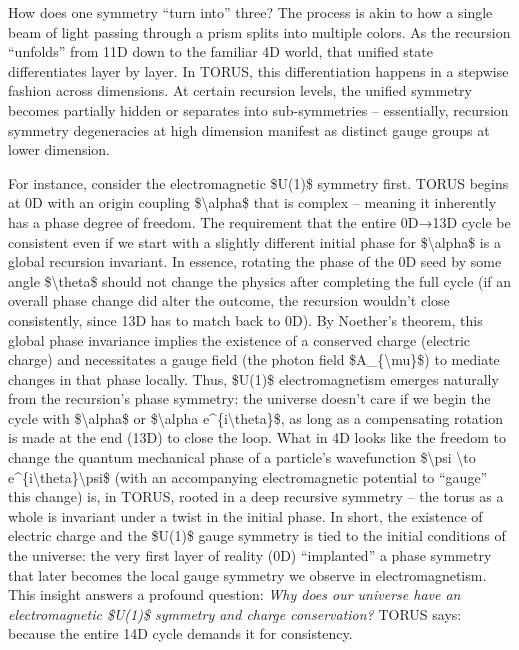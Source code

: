 \documentclass[
]{article}
\begin{document}
How does one symmetry ``turn into'' three? The process is akin to how a
single beam of light passing through a prism splits into multiple
colors. As the recursion ``unfolds'' from 11D down to the familiar 4D
world, that unified state differentiates layer by layer. In TORUS, this
differentiation happens in a stepwise fashion across dimensions. At
certain recursion levels, the unified symmetry becomes partially hidden
or separates into sub-symmetries -- essentially, recursion symmetry
degeneracies at high dimension manifest as distinct gauge groups at
lower dimension.

For instance, consider the electromagnetic \$U(1)\$ symmetry first.
TORUS begins at 0D with an origin coupling \$\textbackslash alpha\$ that
is complex -- meaning it inherently has a phase degree of freedom. The
requirement that the entire 0D→13D cycle be consistent even if we start
with a slightly different initial phase for \$\textbackslash alpha\$ is
a global recursion invariant. In essence, rotating the phase of the 0D
seed by some angle \$\textbackslash theta\$ should not change the
physics after completing the full cycle (if an overall phase change did
alter the outcome, the recursion wouldn't close consistently, since 13D
has to match back to 0D). By Noether's theorem, this global phase
invariance implies the existence of a conserved charge (electric charge)
and necessitates a gauge field (the photon field
\$A\_\{\textbackslash mu\}\$) to mediate changes in that phase locally.
Thus, \$U(1)\$ electromagnetism emerges naturally from the recursion's
phase symmetry: the universe doesn't care if we begin the cycle with
\$\textbackslash alpha\$ or \$\textbackslash alpha
e\^{}\{i\textbackslash theta\}\$, as long as a compensating rotation is
made at the end (13D) to close the loop. What in 4D looks like the
freedom to change the quantum mechanical phase of a particle's
wavefunction \$\textbackslash psi \textbackslash to
e\^{}\{i\textbackslash theta\}\textbackslash psi\$ (with an accompanying
electromagnetic potential to ``gauge'' this change) is, in TORUS, rooted
in a deep recursive symmetry -- the torus as a whole is invariant under
a twist in the initial phase. In short, the existence of electric charge
and the \$U(1)\$ gauge symmetry is tied to the initial conditions of the
universe: the very first layer of reality (0D) ``implanted'' a phase
symmetry that later becomes the local gauge symmetry we observe in
electromagnetism. This insight answers a profound question: \emph{Why
does our universe have an electromagnetic \$U(1)\$ symmetry and charge
conservation?} TORUS says: because the entire 14D cycle demands it for
consistency.
\end{document}
